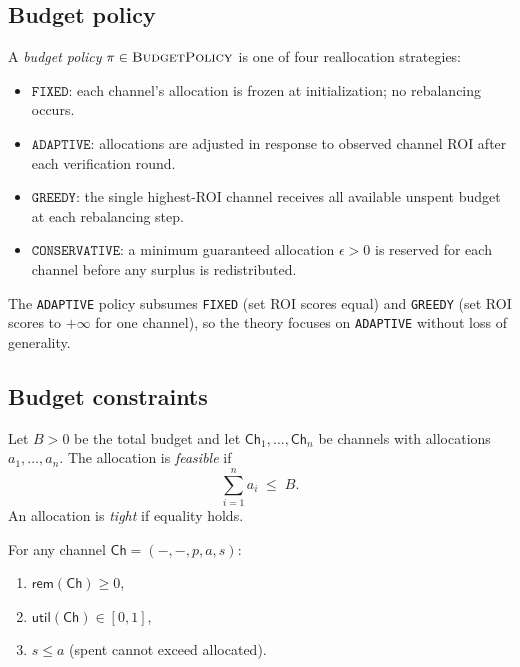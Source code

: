 \documentclass[11pt]{article}
\providecommand{\Chan}{\mathsf{Ch}}            %
\providecommand{\Util}{\mathsf{util}}          %
\providecommand{\Rem}{\mathsf{rem}}            %
\providecommand{\BudPol}{\textsc{BudgetPolicy}}        %
\begin{document}
\subsection{Budget policy}

\begin{definition}\label{def:policy}
A \emph{budget policy} $\pi \in \BudPol$ is one of four reallocation
strategies:
\begin{itemize}
  \item $\texttt{FIXED}$: each channel's allocation is frozen at
    initialization; no rebalancing occurs.
  \item $\texttt{ADAPTIVE}$: allocations are adjusted in response to
    observed channel ROI after each verification round.
  \item $\texttt{GREEDY}$: the single highest-ROI channel receives all
    available unspent budget at each rebalancing step.
  \item $\texttt{CONSERVATIVE}$: a minimum guaranteed allocation
    $\epsilon > 0$ is reserved for each channel before any
    surplus is redistributed.
\end{itemize}
\end{definition}

\begin{remark}
The \texttt{ADAPTIVE} policy subsumes \texttt{FIXED}
(set ROI scores equal) and \texttt{GREEDY}
(set ROI scores to $+\infty$ for one channel), so the
theory focuses on \texttt{ADAPTIVE} without loss of generality.
\end{remark}

\subsection{Budget constraints}

\begin{definition}\label{def:feasible}
Let $B > 0$ be the total budget and let
$\Chan_1, \ldots, \Chan_n$ be channels with allocations
$a_1, \ldots, a_n$.  The allocation is \emph{feasible} if
\[
  \sum_{i=1}^{n} a_i \;\le\; B.
\]
An allocation is \emph{tight} if equality holds.
\end{definition}

\begin{proposition}\label{prop:invariants}
For any channel $\Chan = (-, -, p, a, s)$:
\begin{enumerate}[label=(\alph*)]
  \item $\Rem(\Chan) \ge 0$,
  \item $\Util(\Chan) \in [0, 1]$,
  \item $s \le a$ (spent cannot exceed allocated).
\end{enumerate}
\end{proposition}
\end{document}
